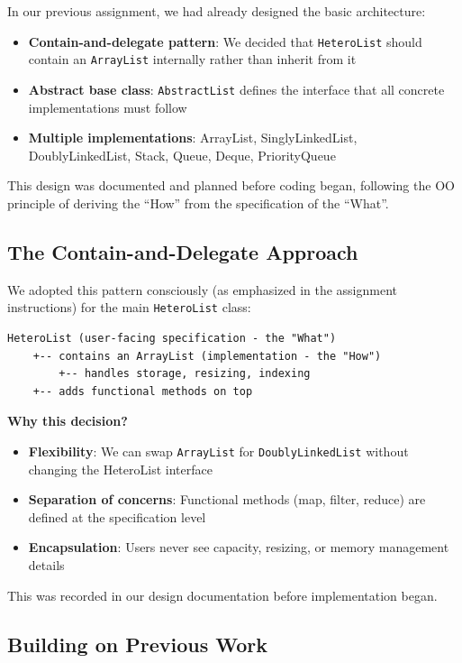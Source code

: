 \documentclass[11pt,a4paper]{article}
\begin{document}
In our previous assignment, we had already designed the basic architecture:
\begin{itemize}
    \item \textbf{Contain-and-delegate pattern}: We decided that \texttt{HeteroList} should contain an \texttt{ArrayList} internally rather than inherit from it
    \item \textbf{Abstract base class}: \texttt{AbstractList} defines the interface that all concrete implementations must follow
    \item \textbf{Multiple implementations}: ArrayList, SinglyLinkedList, DoublyLinkedList, Stack, Queue, Deque, PriorityQueue
\end{itemize}

This design was documented and planned before coding began, following the OO principle of deriving the ``How'' from the specification of the ``What''.

\subsection{The Contain-and-Delegate Approach}

We adopted this pattern consciously (as emphasized in the assignment instructions) for the main \texttt{HeteroList} class:

\begin{verbatim}
HeteroList (user-facing specification - the "What")
    +-- contains an ArrayList (implementation - the "How")
        +-- handles storage, resizing, indexing
    +-- adds functional methods on top
\end{verbatim}

\textbf{Why this decision?}
\begin{itemize}
    \item \textbf{Flexibility}: We can swap \texttt{ArrayList} for \texttt{DoublyLinkedList} without changing the HeteroList interface
    \item \textbf{Separation of concerns}: Functional methods (map, filter, reduce) are defined at the specification level
    \item \textbf{Encapsulation}: Users never see capacity, resizing, or memory management details
\end{itemize}

This was recorded in our design documentation before implementation began.

\subsection{Building on Previous Work}
\end{document}

